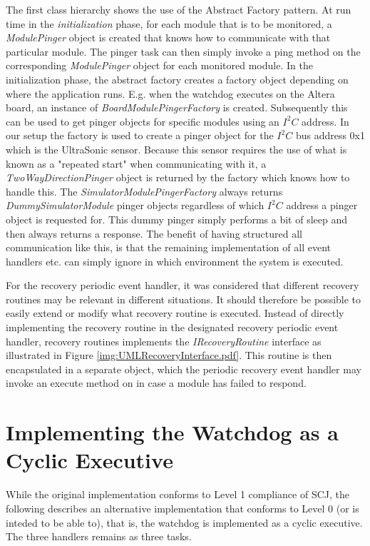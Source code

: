The first class hierarchy shows the use of the Abstract Factory pattern. At run time in the \emph{initialization} phase, for each module that is to be monitored, a \emph{ModulePinger} object is created that knows how to communicate with that particular module. The pinger task can then simply invoke a ping method on the corresponding \emph{ModulePinger} object for each monitored module. In the initialization phase, the abstract factory creates a factory object depending on where the application runs. E.g. when the watchdog executes on the Altera board, an instance of \emph{BoardModulePingerFactory} is created. Subsequently this can be used to get pinger objects for specific modules using an $\textit{I}^2\textit{C}$ address. In our setup the factory is used to create a pinger object for the $\textit{I}^2\textit{C}$ bus address 0x1 which is the UltraSonic sensor. Because this sensor requires the use of what is known as a "repeated start" when communicating with it, a \emph{TwoWayDirectionPinger} object is returned by the factory which knows how to handle this.
The \emph{SimulatorModulePingerFactory} always returns \emph{DummySimulatorModule} pinger objects regardless of which $\textit{I}^2\textit{C}$ address a pinger object is requested for. This dummy pinger simply performs a bit of sleep and then always returns a response. The benefit of having structured all communication like this, is that the remaining implementation of all event handlers etc. can simply ignore in which environment the system is executed.

For the recovery periodic event handler, it was considered that different recovery routines may be relevant in different situations. It should therefore be possible to easily extend or modify what recovery routine is executed. Instead of directly implementing the recovery routine in the designated recovery periodic event handler, recovery routines implements the \emph{IRecoveryRoutine} interface as illustrated in Figure \ref{img:UMLRecoveryInterface.pdf}. This routine is then encapsulated in a separate object, which the periodic recovery event handler may invoke an execute method on in case a module has failed to respond.

\section{Implementing the Watchdog as a Cyclic Executive} %
\label{sec:implementing_the_watchdog_as_a_cyclic_executive}
While the original implementation conforms to Level 1 compliance of SCJ, the following describes an alternative implementation that conforms to Level 0 (or is inteded to be able to), that is, the watchdog is implemented as a cyclic executive. The three handlers remains as three tasks.

